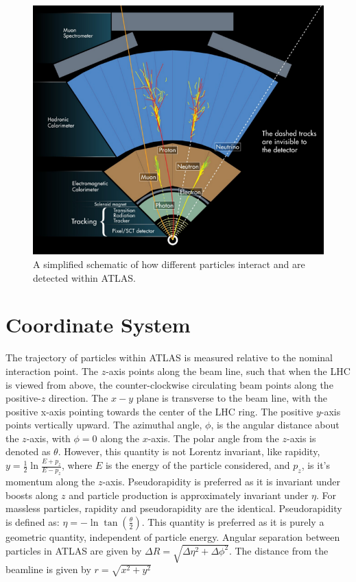 \begin{figure}[h!]
  \centering
  \includegraphics[width=\hsize]{figures/Detector/particle_detection_atlas.png}
  \caption{A simplified schematic of how different particles interact and are detected within ATLAS.} 
  \label{fig:particle_detection}
\end{figure}
\FloatBarrier

\section{Coordinate System}
The trajectory of particles within ATLAS is measured relative to the nominal interaction point. The $z$-axis points along the beam line, such that when the LHC is viewed from above, the counter-clockwise circulating beam points along the positive-$z$ direction. The $x-y$ plane is transverse to the beam line, with the positive x-axis pointing towards the center of the LHC ring. The positive $y$-axis points vertically upward. The azimuthal angle, $\phi$, is the angular distance about the $z$-axis, with $\phi=0$ along the $x$-axis. The polar angle from the $z$-axis is denoted as $\theta$.  However, this quantity is not Lorentz invariant, like rapidity, $y=\frac{1}{2}\ln\frac{E+p_{z}}{E-p_{z}}$, where $E$ is the energy of the particle considered, and $p_{z}$, is it's momentum along the $z$-axis. Pseudorapidity is preferred as it is invariant under boosts along $z$ and particle production is approximately invariant under $\eta$. For massless particles, rapidity and pseudorapidity are the identical. Pseudorapidity is defined as: $\eta = -\ln \tan(\frac{\theta}{2})$.  This quantity is preferred as it is purely a geometric quantity, independent of particle energy. Angular separation between particles in ATLAS are given by $\Delta R = \sqrt{\Delta \eta^{2}+\Delta \phi^{2}}$. The distance from the beamline is given by $r=\sqrt{x^{2}+y^{2}}$
 

